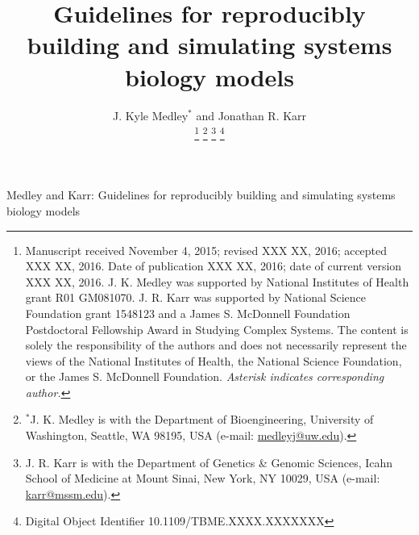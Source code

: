 \documentclass[journal,transmag,twoside]{IEEEtran}
\newcommand{\email}[1]{\href{mailto:#1}{#1}}
\begin{document}
\newcommand{\thetitle}{Guidelines for reproducibly building and simulating systems biology models}
\title{\thetitle}

\author{
    J. Kyle Medley$^*$ and
	Jonathan R. Karr
    
    \thanks{
        Manuscript received November 4, 2015; revised XXX XX, 2016; accepted XXX XX, 2016. Date of publication XXX XX, 2016; date of current version XXX XX, 2016.
        J. K. Medley was supported by National Institutes of Health grant R01 GM081070. J. R. Karr was supported by National Science Foundation grant 1548123 and a James S. McDonnell Foundation Postdoctoral Fellowship Award in Studying Complex Systems. The content is solely the responsibility of the authors and does not necessarily represent the views of the National Institutes of Health, the National Science Foundation, or the James S. McDonnell Foundation.
        \textit{Asterisk indicates corresponding author.}
    }
    \thanks{$^*$J. K. Medley is with the Department of Bioengineering, University of Washington, Seattle, WA 98195, USA (e-mail: \email{medleyj@uw.edu}).}
    \thanks{J. R. Karr is with the Department of Genetics \& Genomic Sciences, Icahn School of Medicine at Mount Sinai, New York, NY 10029, USA (e-mail: \email{karr@mssm.edu}).}
    \thanks{Digital Object Identifier 10.1109/TBME.XXXX.XXXXXXX}
}

%
{Medley and Karr: \thetitle}
% 








\maketitle
\end{document}
